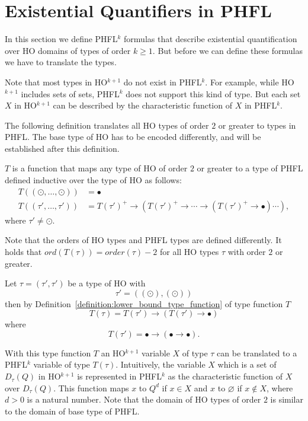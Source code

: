 

\section{Existential Quantifiers in PHFL}\label{sec:existential_quantifiers_in_phfl}

In this section we define PHFL$^{k}$ formulas that describe existential quantification over HO domains of types of
order $k \geq 1$. But before we can define these formulas we have to translate the types.


Note that most types in HO$^{k + 1}$ do not exist in PHFL$^k$. For example, while HO$^{k +
1}$ includes sets of sets, PHFL$^k$ does not support this kind of type.
But each set $X$ in HO$^{k+1}$ can be described by the characteristic function of $X$ in PHFL$^k$.

The following definition translates all HO types of order $2$ or greater to types in PHFL. The base type of HO
has to be encoded differently, and will be established after this definition.

\begin{definition}
    \label{definition:lower_bound_type_function}
    $T$ is a function that maps any type of HO of order $2$ or greater to a type of PHFL defined inductive over the
    type of HO as follows:
    \begin{align*}
        T((\odot, \dots, \odot)) &= \bullet\\
        T((\tau', \dots, \tau')) &= T(\tau')^+ \rightarrow (T(\tau')^+ \rightarrow \dotsb \rightarrow (T(\tau')^+
        \rightarrow \bullet) \dotsb ),
    \end{align*}
    where $\tau' \neq \odot$.
\end{definition}

Note that the orders of HO types and PHFL types are defined differently. It holds that $ord(T(\tau)) = order(\tau) - 2$
for all HO types $\tau$ with order $2$ or greater.

\begin{example}
    Let $\tau = (\tau', \tau')$ be a type of HO with
    \[\tau' = ((\odot), (\odot))\]
    then by Definition~\ref{definition:lower_bound_type_function} of type function $T$
    \[T(\tau) = T(\tau') \rightarrow (T(\tau') \rightarrow \bullet)\]
    where
    \[T(\tau') = \bullet \rightarrow (\bullet \rightarrow \bullet).\]
\end{example}

With this type function $T$ an HO$^{k + 1}$ variable $X$ of type $\tau$ can be translated to a PHFL$^k$ variable
of type $T(\tau)$. Intuitively, the variable $X$ which is a set of $D_\tau(Q)$ in HO$^{k+1}$ is represented
in PHFL$^k$ as the characteristic function of $X$ over $D_\tau(Q)$. This function maps $x$ to $Q^d$ if $x \in X$ and $x$ to $\varnothing$ if $x\not\in X$, where $d > 0$ is a natural number. Note that the domain of HO types
of order $2$ is similar to the domain of base type of PHFL.

